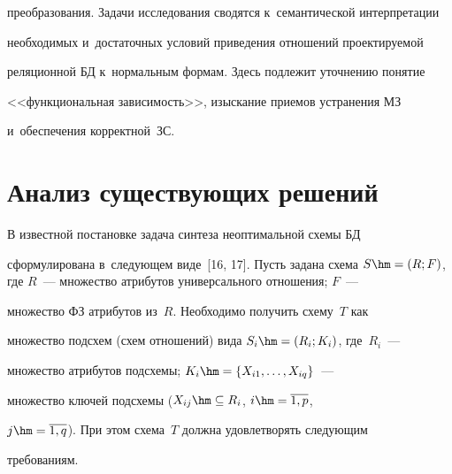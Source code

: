 преобразования. Задачи исследования сводятся к~семантической интерпретации 

необходимых и~достаточных условий приведения отношений про\-ек\-ти\-ру\-емой 

реляционной БД к~нормальным формам. Здесь подлежит уточнению понятие 

<<функциональная за\-ви\-си\-мость>>, изыскание приемов устранения МЗ 

и~обеспечения кор\-рект\-ной~ЗС.

{



}



\section{Анализ существующих решений}

  

  В известной постановке задача синтеза неоптимальной схемы БД 

сформулирована в~следующем виде~[16, 17]. Пусть задана схема $S\hm= 

(R;F)$, где $R$~--- множество атрибутов универсального отношения; $F$~--- 

множество ФЗ атрибутов из~$R$. Необходимо получить схему~$T$ как 

множество подсхем (схем отношений) вида $S_i\hm= (R_i; K_i)$, где~$R_i$~--- 

множество атрибутов подсхемы; $K_i\hm= \{X_{i1}, \ldots , X_{iq}\}$~--- 

множество ключей подсхемы ($X_{ij}\hm\subseteq R_i$, $i\hm= \overline{1,p}$, 

$j\hm= \overline{1,q}$). При этом схема~$T$ должна удовлетворять следующим 

требованиям.

